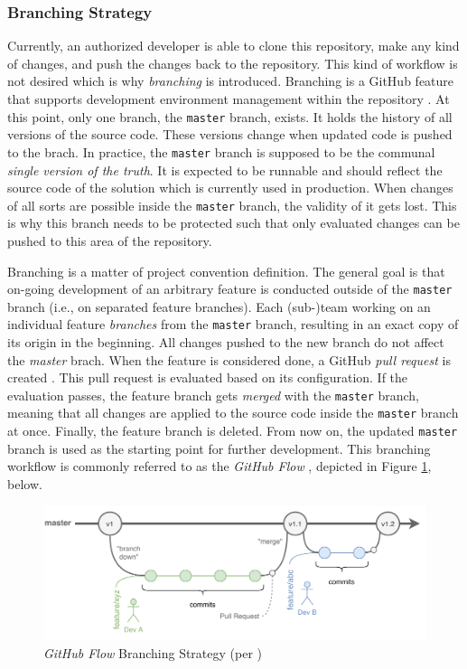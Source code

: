 \subsubsection{Branching Strategy}
Currently, an authorized developer is able to clone this repository, make any kind of changes, and push the changes back to the repository. This kind of workflow is not desired which is why \textit{branching} is introduced. Branching is a GitHub feature that supports development environment management within the repository \cite[62\psqq]{Chacon2020}. At this point, only one branch, the \texttt{master} branch, exists. It holds the history of all versions of the source code. These versions change when updated code is pushed to the brach. In practice, the \texttt{master} branch is supposed to be the communal \textit{single version of the truth}. It is expected to be runnable and should reflect the source code of the solution which is currently used in production. When changes of all sorts are possible inside the \texttt{master} branch, the validity of it gets lost. This is why this branch needs to be protected such that only evaluated changes can be pushed to this area of the repository.

Branching is a matter of project convention definition. The general goal is that on-going development of an arbitrary feature is conducted outside of the \texttt{master} branch (i.e., on separated feature branches). Each (sub-)team working on an individual feature \textit{branches} from the \texttt{master} branch, resulting in an exact copy of its origin in the beginning. All changes pushed to the new branch do not affect the \textit{master} brach. When the feature is considered done, a GitHub \textit{pull request} is created \cite{github}. This pull request is evaluated based on its configuration. If the evaluation passes, the feature branch gets \textit{merged} with the \texttt{master} branch, meaning that all changes are applied to the source code inside the \texttt{master} branch at once. Finally, the feature branch is deleted. From now on, the updated \texttt{master} branch is used as the starting point for further development. This branching workflow is commonly referred to as the \textit{GitHub Flow} \cite{GitHub2020}, depicted in Figure \ref{fig:5-github-flow}, below.

\begin{figure}[h!]
	\centering
	\includegraphics[width=\linewidth]{main-matter/img/5-github-flow.pdf}
	\caption[\textit{GitHub Flow} Branching Strategy]{\textit{GitHub Flow} Branching Strategy (per \cite{GitHub2020})}
	\label{fig:5-github-flow}
\end{figure}

